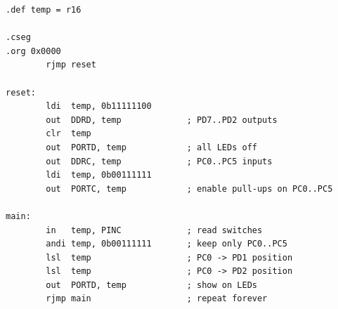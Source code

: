 \documentclass[11pt]{article}
\begin{document}
\begin{lstlisting}[language=avrasm,caption={Program 1. Copies switch state to the LEDs.},label={code:copy}]
.def temp = r16

.cseg
.org 0x0000
        rjmp reset

reset:
        ldi  temp, 0b11111100
        out  DDRD, temp             ; PD7..PD2 outputs
        clr  temp
        out  PORTD, temp            ; all LEDs off
        out  DDRC, temp             ; PC0..PC5 inputs
        ldi  temp, 0b00111111
        out  PORTC, temp            ; enable pull-ups on PC0..PC5

main:
        in   temp, PINC             ; read switches
        andi temp, 0b00111111       ; keep only PC0..PC5
        lsl  temp                   ; PC0 -> PD1 position
        lsl  temp                   ; PC0 -> PD2 position
        out  PORTD, temp            ; show on LEDs
        rjmp main                   ; repeat forever
\end{lstlisting}
\end{document}

